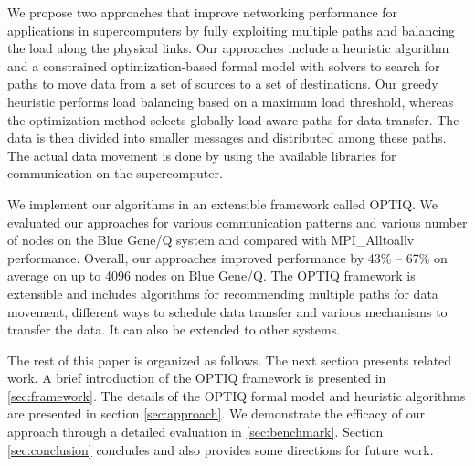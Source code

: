 We propose two approaches that improve networking performance for applications in supercomputers by fully exploiting multiple paths and balancing the load along the physical links. Our approaches include a heuristic algorithm and a constrained optimization-based formal model with solvers to search for paths to move data from a set of sources to a set of destinations. Our greedy heuristic performs load balancing based on a maximum load threshold, whereas the optimization method selects globally load-aware paths for data transfer. The data is then divided into smaller messages and distributed among these paths. The actual data movement is done by using the available libraries for communication on the supercomputer. 

We implement our algorithms in an extensible framework called OPTIQ. 
We evaluated our approaches for various communication patterns and various number of nodes on the Blue Gene/Q system and compared with MPI\_Alltoallv performance. Overall, our approaches improved performance by 43\% -- 67\% on average on up to 4096 nodes on Blue Gene/Q. The OPTIQ framework is extensible and includes algorithms for recommending multiple paths for data movement, different ways to schedule data transfer and various mechanisms to transfer the data. It can also be extended to other systems.

The rest of this paper is organized as follows. 
The next section presents related work. A brief introduction of the OPTIQ framework is presented in \ref{sec:framework}. The details of the OPTIQ formal model and heuristic algorithms are presented in section \ref{sec:approach}. We demonstrate the efficacy of our approach through a detailed evaluation in \ref{sec:benchmark}. Section \ref{sec:conclusion} concludes and also provides some directions for future work.
